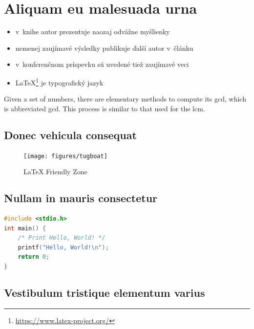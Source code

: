 \section{Aliquam eu malesuada urna}
\blindtext
\begin{itemize}
    \item v~knihe \cite{book} autor prezentuje naozaj odvážne myšlienky
    \item nemenej zaujímavé výsledky publikuje ďalší autor v~článku \cite{article} 
    \item v~konferenčnom príspevku \cite{conference} sú uvedené tiež zaujímavé veci
    \item \LaTeX{}\footnote{\url{https://www.latex-project.org/}} je typografický jazyk
\end{itemize}

Given a set of numbers, there are elementary methods to compute its \acrlong{gcd}, which is abbreviated \acrshort{gcd}. This process is similar to that used for the \acrfull{lcm}.

\subsection{Donec vehicula consequat}
\blindtext

\begin{figure}[!ht]
    \centering
    \texttt{[image: figures/tugboat]}
    \caption{\LaTeX{} Friendly Zone \label{o:latex_friendly_zone}}
\end{figure}

\subsection{Nullam in mauris consectetur}
\blindtext

\begin{lstlisting}[language=C,caption={Program, ktorý pozdraví celý svet}]
#include <stdio.h>
int main() {
    /* Print Hello, World! */
    printf("Hello, World!\n");
    return 0;
}
\end{lstlisting}


\subsection{Vestibulum tristique elementum varius}
\blindtext

